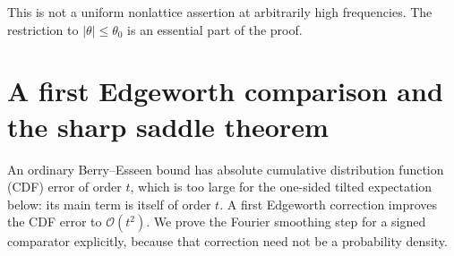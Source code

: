 \documentclass[11pt]{article}
\numberwithin{equation}{section}
\theoremstyle{remark}\newtheorem{remark}[theorem]{Remark}
\newcommand{\Oh}{\mathcal O}
\begin{document}
This is not a uniform nonlattice assertion at arbitrarily high frequencies. The restriction to $|\theta|\le\theta_0$ is an essential part of the proof.

\section{A first Edgeworth comparison and the sharp saddle theorem}\label{srs:sec:smoothing}
An ordinary Berry--Esseen bound has absolute cumulative distribution function (CDF) error of order $t$, which is too large for the one-sided tilted expectation below: its main term is itself of order $t$. A first Edgeworth correction improves the CDF error to $\Oh(t^2)$. We prove the Fourier smoothing step for a signed comparator explicitly, because that correction need not be a probability density.
\end{document}
